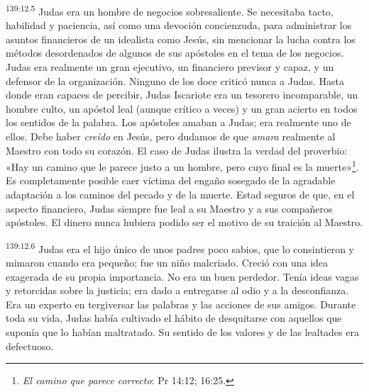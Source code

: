 \par
\textsuperscript{139:12.5} Judas era un hombre de negocios sobresaliente. Se necesitaba tacto, habilidad y paciencia, así como una devoción concienzuda, para administrar los asuntos financieros de un idealista como Jesús, sin mencionar la lucha contra los métodos desordenados de algunos de sus apóstoles en el tema de los negocios. Judas era realmente un gran ejecutivo, un financiero previsor y capaz, y un defensor de la organización. Ninguno de los doce criticó nunca a Judas. Hasta donde eran capaces de percibir, Judas Iscariote era un tesorero incomparable, un hombre culto, un apóstol leal (aunque crítico a veces) y un gran acierto en todos los sentidos de la palabra. Los apóstoles amaban a Judas; era realmente uno de ellos. Debe haber \textit{creído} en Jesús, pero dudamos de que \textit{amara} realmente al Maestro con todo su corazón. El caso de Judas ilustra la verdad del proverbio: «Hay un camino que le parece justo a un hombre, pero cuyo final es la muerte»\footnote{\textit{El camino que parece correcto}: Pr 14:12; 16:25.}. Es completamente posible caer víctima del engaño sosegado de la agradable adaptación a los caminos del pecado y de la muerte. Estad seguros de que, en el aspecto financiero, Judas siempre fue leal a su Maestro y a sus compañeros apóstoles. El dinero nunca hubiera podido ser el motivo de su traición al Maestro.

\par
\textsuperscript{139:12.6} Judas era el hijo único de unos padres poco sabios, que lo consintieron y mimaron cuando era pequeño; fue un niño malcriado. Creció con una idea exagerada de su propia importancia. No era un buen perdedor. Tenía ideas vagas y retorcidas sobre la justicia; era dado a entregarse al odio y a la desconfianza. Era un experto en tergiversar las palabras y las acciones de sus amigos. Durante toda su vida, Judas había cultivado el hábito de desquitarse con aquellos que suponía que lo habían maltratado. Su sentido de los valores y de las lealtades era defectuoso.

